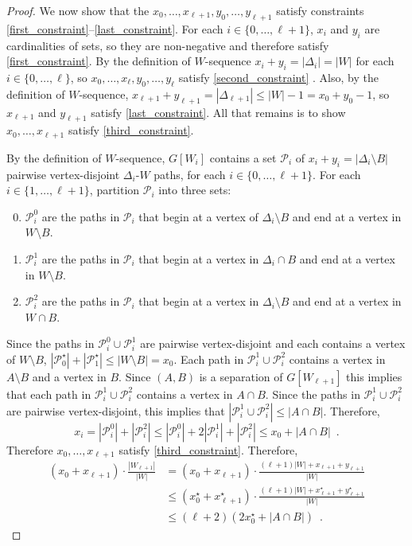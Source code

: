 \documentclass{patmorin}
\begin{document}
\begin{proof}
  We now show that the $x_0,\ldots,x_{\ell+1},y_0,\ldots,y_{\ell+1}$ satisfy constraints \eqref{first_constraint}--\eqref{last_constraint}.  For each $i\in\{0,\ldots,\ell+1\}$, $x_i$ and $y_i$ are cardinalities of sets, so they are non-negative and therefore satisfy \eqref{first_constraint}.  By the definition of $W$-sequence $x_i+y_i=|\Delta_i|=|W|$ for each $i\in\{0,\ldots,\ell\}$, so $x_0,\ldots,x_{\ell},y_0,\ldots,y_\ell$ satisfy \eqref{second_constraint} .  Also, by the definition of $W$-sequence, $x_{\ell+1}+y_{\ell+1}=|\Delta_{\ell+1}|\le |W|-1=x_0+y_0-1$, so $x_{\ell+1}$ and $y_{\ell+1}$ satisfy \eqref{last_constraint}.  All that remains is to show $x_0,\ldots,x_{\ell+1}$ satisfy \eqref{third_constraint}.

  By the definition of $W$-sequence, $G[W_{i}]$ contains a set $\mathcal{P}_i$ of $x_i+y_i=|\Delta_i\setminus B|$ pairwise vertex-disjoint $\Delta_i$-$W$ paths, for each $i\in\{0,\ldots,\ell+1\}$.  For each $i\in\{1,\ldots,\ell+1\}$, partition $\mathcal{P}_i$ into three sets:
  \begin{enumerate}\setcounter{enumi}{-1}
      \item $\mathcal{P}^0_i$ are the paths in $\mathcal{P}_i$ that begin at a vertex of $\Delta_{i}\setminus B$ and end at a vertex in $W\setminus B$.
      \item $\mathcal{P}^1_i$ are the paths in $\mathcal{P}_i$ that begin at a vertex in $\Delta_{i}\cap B$ and end at a vertex in $W\setminus B$.
      \item $\mathcal{P}^2_i$ are the paths in $\mathcal{P}_i$ that begin at a vertex in $\Delta_{i}\setminus B$ and end at a vertex in $W\cap B$.
  \end{enumerate}
  Since the paths in $\mathcal{P}_i^0\cup\mathcal{P}_i^1$ are pairwise vertex-disjoint and each contains a vertex of $W\setminus B$, $|\mathcal{P}_0^\star|+|\mathcal{P}_1^\star|\le|W\setminus B|=x_0$.
  Each path in $\mathcal{P}_i^1\cup \mathcal{P}_i^2$ contains a vertex in $A\setminus B$ and a vertex in $B$.  Since $(A,B)$ is a separation of $G[W_{\ell+1}]$ this implies that each path in $\mathcal{P}_i^1\cup \mathcal{P}_i^2$ contains a vertex in $A\cap B$. Since the paths in  $\mathcal{P}_i^1\cup \mathcal{P}_i^2$ are pairwise vertex-disjoint, this implies that $|\mathcal{P}_i^1\cup \mathcal{P}_i^2|\le |A\cap B|$. Therefore,
  \[
    x_i = |\mathcal{P}_i^0| + |\mathcal{P}_i^2|
    \le |\mathcal{P}_i^0| + 2|\mathcal{P}_i^1| + |\mathcal{P}_i^2|
    \le x_0+|A\cap B| \enspace .
  \]
  Therefore $x_0,\ldots,x_{\ell+1}$ satisfy \eqref{third_constraint}.  Therefore,
  \begin{align*}
    (x_0+x_{\ell+1})\cdot\frac{|W_{\ell+1}|}{|W|}
    & = (x_0+x_{\ell+1})\cdot\frac{(\ell+1)|W|+x_{\ell+1}+y_{\ell+1}}{|W|} \\
    & \le (x_0^\star+x_{\ell+1}^\star)\cdot\frac{(\ell+1)|W|+x_{\ell+1}^\star+y_{\ell+1}^\star}{|W|} \\
    & \le (\ell+2)(2x_0^\star + |A\cap B|) \enspace .
  \end{align*}


\end{proof}
\end{document}
